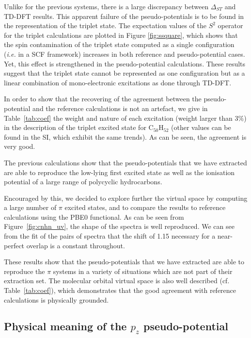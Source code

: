 \documentclass[12pt]{article}
\begin{document}
Unlike for the previous systems, there is a large discrepancy between $\Delta_{ST}$
and TD-DFT results.
This apparent failure of the pseudo-potentials is to be found in the representation
of the triplet state. The expectation values of the $S^2$ operator for the triplet calculations
are plotted in Figure \ref{fig:ssquare}, which shows that the spin contamination
of the triplet state computed as a single configuration (\emph{i.e.} in a SCF
framework) increases in both reference and pseudo-potential cases.
Yet, this effect is strengthened in the pseudo-potential calculations.
These results suggest that the triplet state cannot be represented as one configuration
but as a linear combination of mono-electronic excitations as done through TD-DFT.

In order to show that the recovering of the agreement between the pseudo-potential
and the reference calculations is not an artefact, we give in Table~\ref{tab:coef}
the weight and nature of each excitation (weight larger than 3\%)
in the description of the triplet excited state for
C$_{50}$H$_{52}$ (other values can be found in the SI, which exhibit the same trends).
As can be seen, the agreement is very good. 

The previous calculations show that the pseudo-potentials that we have extracted
are able to reproduce the low-lying first excited state as well as the ionisation potential
of a large range of polycyclic hydrocarbons.

Encouraged by this, we decided to explore further the virtual space by computing a large number of $\pi$ excited states, and to compare the results to reference calculations using the PBE0 functional. As can be seen from Figure~\ref{fig:cnhn_uv}, the shape of the spectra is well reproduced. We can see from the fit of the pairs of spectra that the shift of 1.15 necessary for a near-perfect overlap is a constant throughout.

These results show that the pseudo-potentials that we have extracted are able to reproduce the
$\pi$ systems in a variety of situations which are not part of their extraction set.
The molecular orbital virtual space is also well described (cf. Table~\ref{tab:coef}),
which demonstrates that the good agreement with reference calculations is
physically grounded.

\subsection*{\sffamily \large Physical meaning of the \(p_{z}\) pseudo-potential} \label{minimalpotguess}
\end{document}
